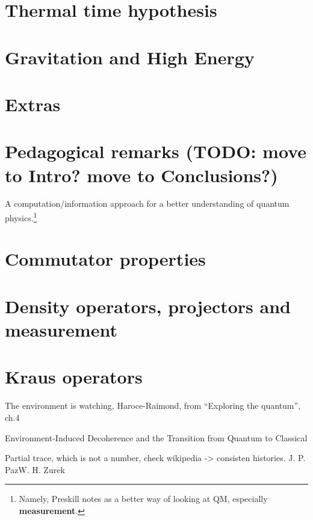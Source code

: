 \documentclass{book}
\begin{document}
\chapter{Thermal time hypothesis}


\chapter{Gravitation and High Energy}



\chapter{Extras}


\chapter{Pedagogical remarks (TODO: move to Intro? move to Conclusions?)}
A computation/information approach for a better understanding of quantum
physics.\footnote{
  Namely, Preskill notes \cite{PreskillNotes} as a better way of looking at QM,
  especially \textbf{measurement}.
}

\appendix
\chapter{Commutator properties}

\chapter{Density operators, projectors and measurement}

\chapter{Kraus operators}
The environment is watching, Haroce-Raimond, from ``Exploring the quantum'', ch.4

Environment-Induced Decoherence and the Transition from Quantum to Classical

Partial trace, which is not a number, check wikipedia -> consisten histories.
J. P. PazW. H. Zurek

\printbibliography[title=References]
\end{document}

